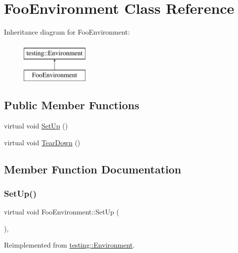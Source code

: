 \hypertarget{classFooEnvironment}{}\section{Foo\+Environment Class Reference}
\label{classFooEnvironment}
Inheritance diagram for Foo\+Environment\+:\begin{figure}[H]
\begin{center}
\leavevmode
\includegraphics[height=2.000000cm]{classFooEnvironment}
\end{center}
\end{figure}
\subsection*{Public Member Functions}
\begin{DoxyCompactItemize}
\item 
virtual void \mbox{\hyperlink{classFooEnvironment_a7db8d8b312805aff437ae8534132a56d}{Set\+Up}} ()
\item 
virtual void \mbox{\hyperlink{classFooEnvironment_a99a2c9df52106cce9e7a4bdda53df802}{Tear\+Down}} ()
\end{DoxyCompactItemize}


\subsection{Member Function Documentation}
\mbox{\label{classFooEnvironment_a7db8d8b312805aff437ae8534132a56d}} 
\subsubsection{\texorpdfstring{SetUp()}{SetUp()}}
{\footnotesize\ttfamily virtual void Foo\+Environment\+::\+Set\+Up (\begin{DoxyParamCaption}{ }\end{DoxyParamCaption})\hspace{0.3cm}{\ttfamily [inline]}, {\ttfamily [virtual]}}



Reimplemented from \mbox{\hyperlink{classtesting_1_1Environment_a1bf8cafaa9d4eba9feb98655ee434eb3}{testing\+::\+Environment}}.

